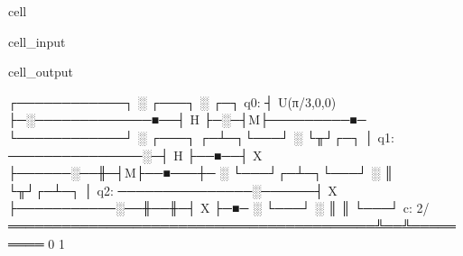 \documentclass[letterpaper,10pt,english]{jupyterBook}
\begin{document}
\begin{sphinxuseclass}{cell}
\begin{sphinxVerbatimInput}
\begin{sphinxuseclass}{cell_input}
\begin{sphinxVerbatim}[commandchars=\\\{\}]





\PYG{p}{[}\PYG{p}{]}\PYG{p}{[}\PYG{p}{]}


\end{sphinxVerbatim}

\end{sphinxuseclass}\end{sphinxVerbatimInput}
\begin{sphinxVerbatimOutput}

\begin{sphinxuseclass}{cell_output}
\begin{sphinxVerbatim}[commandchars=\\\{\}]
     ┌────────────┐ ░                ┌───┐ ░ ┌─┐
q\PYGZus{}0: ┤ U(π/3,0,0) ├─░─────────────■──┤ H ├─░─┤M├─────────■─
     └────────────┘ ░ ┌───┐     ┌─┴─┐└───┘ ░ └╥┘┌─┐      │
q\PYGZus{}1: ───────────────░─┤ H ├──■──┤ X ├──────░──╫─┤M├──■───┼─
                    ░ └───┘┌─┴─┐└───┘      ░  ║ └╥┘┌─┴─┐ │
q\PYGZus{}2: ───────────────░──────┤ X ├───────────░──╫──╫─┤ X ├─■─
                    ░      └───┘           ░  ║  ║ └───┘
c: 2/═════════════════════════════════════════╩══╩═════════
                                              0  1
\end{sphinxVerbatim}

\end{sphinxuseclass}\end{sphinxVerbatimOutput}

\end{sphinxuseclass}
\end{document}
